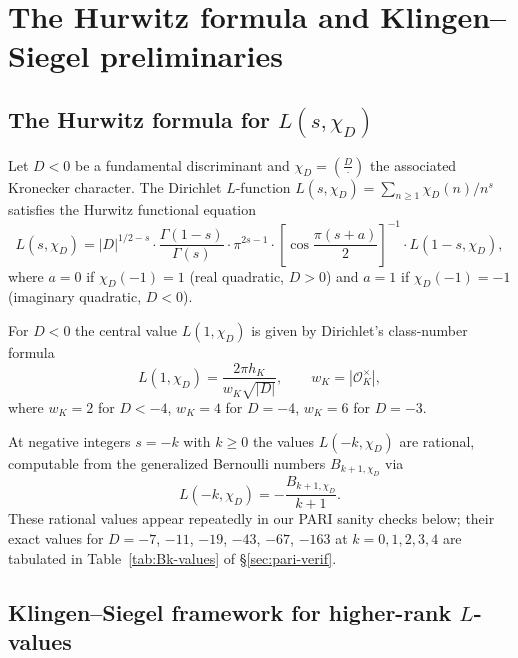 \documentclass[11pt,a4paper]{amsart}
\theoremstyle{definition}
\newcommand{\OK}{\mathcal{O}_K}
\newcommand{\hK}{h_{K}}
\begin{document}
\section{The Hurwitz formula and Klingen--Siegel preliminaries}\label{sec:hurwitz}

\subsection{The Hurwitz formula for $L(s,\chi_D)$}\label{sec:hurwitz-formula}

Let $D < 0$ be a fundamental discriminant and $\chi_D = \left(\frac{D}{\cdot}\right)$ the associated Kronecker character. The Dirichlet $L$-function $L(s, \chi_D) = \sum_{n \ge 1} \chi_D(n)/n^s$ satisfies the Hurwitz functional equation~\cite[\S2.5]{Cohen2007}
\begin{equation}\label{eq:hurwitz-fe}
L(s, \chi_D) = |D|^{1/2 - s} \cdot \frac{\Gamma(1-s)}{\Gamma(s)} \cdot \pi^{2s - 1} \cdot \left[\cos \frac{\pi(s + a)}{2}\right]^{-1} \cdot L(1 - s, \chi_D),
\end{equation}
where $a = 0$ if $\chi_D(-1) = 1$ (real quadratic, $D > 0$) and $a = 1$ if $\chi_D(-1) = -1$ (imaginary quadratic, $D < 0$).

For $D < 0$ the central value $L(1, \chi_D)$ is given by Dirichlet's class-number formula
\begin{equation}\label{eq:dirichlet-cnf}
L(1, \chi_D) = \frac{2 \pi \hK}{w_K \sqrt{|D|}}, \qquad w_K = |\OK^\times|,
\end{equation}
where $w_K = 2$ for $D < -4$, $w_K = 4$ for $D = -4$, $w_K = 6$ for $D = -3$.

At negative integers $s = -k$ with $k \ge 0$ the values $L(-k, \chi_D)$ are rational, computable from the generalized Bernoulli numbers $B_{k+1, \chi_D}$ via
\begin{equation}\label{eq:Bk}
L(-k, \chi_D) = - \frac{B_{k+1, \chi_D}}{k+1}.
\end{equation}
These rational values appear repeatedly in our PARI sanity checks below; their exact values for $D = -7$, $-11$, $-19$, $-43$, $-67$, $-163$ at $k = 0, 1, 2, 3, 4$ are tabulated in Table~\ref{tab:Bk-values} of \S\ref{sec:pari-verif}.

\subsection{Klingen--Siegel framework for higher-rank $L$-values}\label{sec:klingen}
\end{document}
